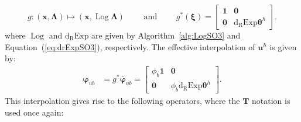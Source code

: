 %
\begin{equation*} 
g: (\bm{x}, \bm{\Lambda})\mapsto (\bm{x}, \operatorname{Log} \bm{\Lambda})
\qquad\text{ and }\qquad
{{g}}^*(\bm{\xi}) = \begin{bmatrix}
\mathbf{1} & \mathbf{0}\\
\mathbf{0} & \operatorname{d_{\scriptscriptstyle{R}}Exp}\bm{\theta}^h
\end{bmatrix}.
\end{equation*}
  where \(\operatorname{Log}\) and
\(\operatorname{d_{\scriptscriptstyle{R}}Exp}\) are given by
Algorithm~\ref{alg:LogSO3} and Equation~(\ref{eq:drExpSO3}), respectively. The effective
interpolation of \(\bm{u}^h\) is given by: %
\begin{equation*} 
\begin{aligned}
\bm{\varphi}^{}_{u b} &= g^*\bar{\bm{\varphi}}_{u b} %
=
\begin{bmatrix}
    \phi_b \mathbf{1} & \mathbf{0} \\
    \mathbf{0} & \phi_b \operatorname{d_{\scriptscriptstyle{R}}Exp} \bm{\theta}^h
\end{bmatrix} .
\end{aligned}
\end{equation*}
This interpolation gives rise to the following operators, where the \(\mathbf{T}\) notation is used once again:
